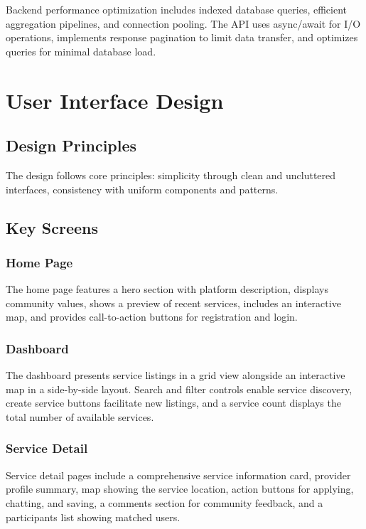 \documentclass[12pt,a4paper]{report}
\begin{document}
Backend performance optimization includes indexed database queries, efficient aggregation pipelines, and connection pooling. The API uses async/await for I/O operations, implements response pagination to limit data transfer, and optimizes queries for minimal database load.

\section{User Interface Design}

\subsection{Design Principles}

The design follows core principles: simplicity through clean and uncluttered interfaces, consistency with uniform components and patterns.

\subsection{Key Screens}

\subsubsection{Home Page}

The home page features a hero section with platform description, displays community values, shows a preview of recent services, includes an interactive map, and provides call-to-action buttons for registration and login.

\subsubsection{Dashboard}

The dashboard presents service listings in a grid view alongside an interactive map in a side-by-side layout. Search and filter controls enable service discovery, create service buttons facilitate new listings, and a service count displays the total number of available services.

\subsubsection{Service Detail}

Service detail pages include a comprehensive service information card, provider profile summary, map showing the service location, action buttons for applying, chatting, and saving, a comments section for community feedback, and a participants list showing matched users.
\end{document}
